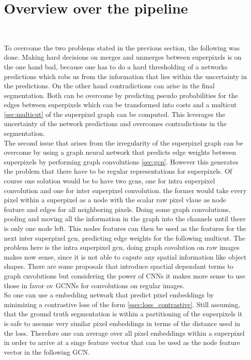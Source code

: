 \section{Overview over the pipeline}~\label{seg:ov_pip}

To overcome the two problems stated in the previous section, the following was done. Making hard decisions on merges and unmerges between superpixels is on the one hand bad, because one has to do a hard thresholding of a networks predictions which robs us from the information that lies within the uncertainty in the predictions. On the other hand contradictions can arise in the final segmentation. Both can be overcome by predicting pseudo probabilities for the edges between superpixels which can be transformed into costs and a multicut \ref{sec:multicut} of the superpixel graph can be computed. This leverages the uncertainty of the network predictions and overcomes contradictions in the segmentation. \\
The second issue that arises from the irregularity of the superpixel graph can be overcome by using a graph neural network that predicts edge weights between superpixels by performing graph convolutions \ref{sec:gcn}. However this generates the problem that there have to be regular representations for superpixels. Of course one solution would be to have two gcns, one for intra superpixel convolution and one for inter superpixel convolution. the former would take every pixel within a superpixel as a node with the scalar raw pixel vlaue as node feature and edges for all neighboring pixels. Doing some graph convolutions, pooling and moving all the information in the graph into the channels until there is only one node left. This nodes features can then be used as the features for the next inter superpixel gcn, predicting edge weights for the following multicut. The problem here is the intra superpixel gcn, doing graph covolution on raw images makes now sense, since it is not able to capute any spatial information like object shapes. There are some proposals \cite{monti2016geometric} that introduce spactial dependant terms to graph cnvolutions but considering the power of CNNs it makes more sense to use those in favor ov GCNNs for convolutions on regular images.\\
So one can use a embedding network that predict pixel embeddings by minimizing a contrastive loss of the form \ref{ssec:loss_contrastive}. Still assuming, that the ground truth segmentation is within a partitioning of the superpixels it is safe to assume very similar pixel embeddings in terms of the distance used in the loss. Therefore one can average over all pixel embeddings within a superpixel in order to arrive at a singe feature vector that can be used as the node feature vector in the following GCN.